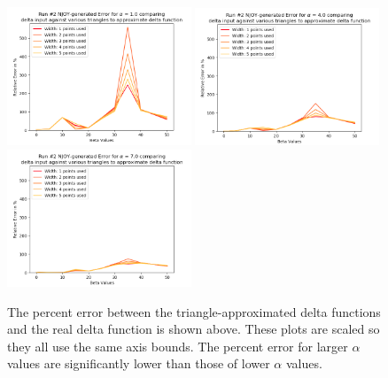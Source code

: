\documentclass[a4paper]{article}
\begin{document}
\begin{figure}[H]
\centering
\includegraphics[width=0.49\textwidth]{run2_error_scaled_out_alpha_equals_1.png}
\includegraphics[width=0.49\textwidth]{run2_error_scaled_out_alpha_equals_4.png}
\includegraphics[width=0.49\textwidth]{run2_error_scaled_out_alpha_equals_7.png}
\caption{\label{fig:run2_errorScaled}The percent error between the triangle-approximated delta functions and the real delta function is shown above. These plots are scaled so they all use the same axis bounds. The percent error for larger $\alpha$ values are significantly lower than those of lower $\alpha$ values. }
\end{figure}
\end{document}

